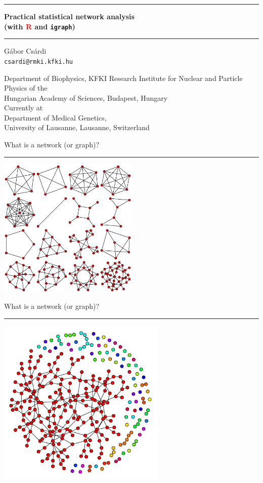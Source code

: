 \documentclass[landscape,fleqno]{foils}
\newcommand{\stitle}[1]{{\color{blue}\Large #1\par\vspace*{10pt}\hrule}}
\newcommand{\cstitle}[1]{{\centering\color{blue}\Large #1\par\vspace*{10pt}\hrule}}
\renewcommand{\emph}[1]{\textcolor{red}{\bf #1}}
\newcommand{\igraph}{\texttt{{igraph}}\xspace}
\begin{document}
\RaggedRight


\thispagestyle{empty}
\vspace*{1cm}
{\centering
\hrule
\Large
\vspace*{1cm}
{\bf Practical statistical network analysis\\ (with \emph{R} and \igraph)}
\vspace*{1cm}
\par
\hrule
\par
\vspace*{2cm}
\normalsize G\'abor Cs\'ardi\\
\small \verb+csardi@rmki.kfki.hu+
\par
\vspace*{1.5cm}
Department of Biophysics, 
KFKI Research Institute for Nuclear and Particle Physics of the\\
Hungarian Academy of Sciences, Budapest, Hungary\\[15pt]
Currently at \\Department of Medical Genetics, \\
University of Lausanne, Lausanne, Switzerland\\
}

\newpage
\stitle{What is a network (or graph)?}
\includegraphics[width=0.5\textwidth]{frplots}

\newpage
\cstitle{What is a network (or graph)?}
\begin{center}
\includegraphics[width=0.6\textwidth]{ercomps}
\end{center}
\end{document}
